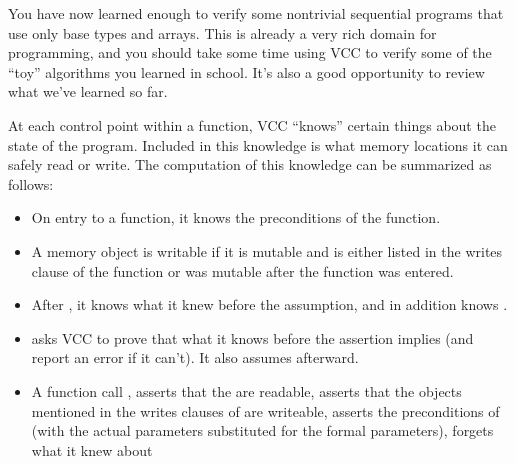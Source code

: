 {{You have now learned enough to verify some nontrivial sequential
programs that use only base types and arrays.  This is already a very
rich domain for programming, and you should take some time using VCC
to verify some of the ``toy'' algorithms you learned in school. It's
also a good opportunity to review what we've learned so far.

At each control point within a function, VCC ``knows'' certain things
about the state of the program. Included in this knowledge is what
memory locations it can safely read or write. The computation of this
knowledge can be summarized as follows:
\begin{itemize}
\item
On entry to a function, it knows the preconditions of the function.
\item
A memory object is writable if it is mutable and is either listed in the 
writes clause of the function or was mutable after the function was entered.
\item
After , it knows what it knew before the assumption,
and in addition knows .
\item
{} asks VCC to prove that what it knows before the
assertion implies  (and report an error if it can't). 
It also assumes  afterward.
\item 
A function call , 
asserts that the  are readable, asserts that the objects
mentioned in the writes clauses of  are writeable,
asserts the preconditions of  (with the actual parameters
substituted for the formal parameters), forgets what it knew about

\end{itemize}}}
